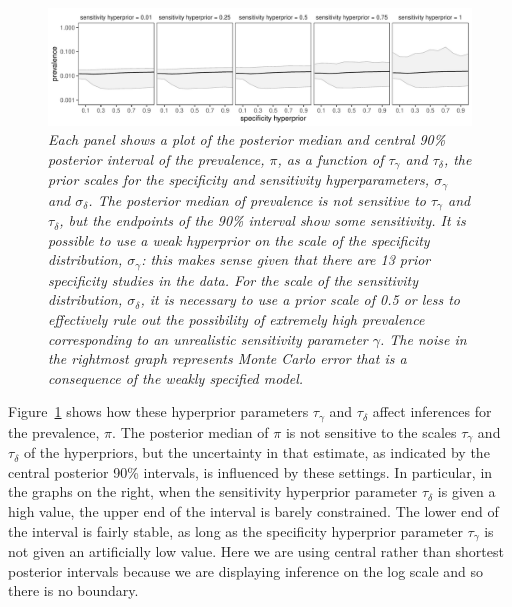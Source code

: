 \documentclass[11pt]{article}
\begin{document}
\begin{figure}
  \centerline{\includegraphics[width=\textwidth]{img/prior-sensitivity-2.pdf}}
  \vspace{-.15in}
\caption{\em Each panel shows a plot of the posterior median and central 90\%
  posterior interval of the prevalence, $\pi$, as a function of $\tau_{\gamma}$ and $\tau_{\delta}$, the prior scales for the specificity  and sensitivity
  hyperparameters, $\sigma_{\gamma}$ and $\sigma_{\delta}$.
  The posterior median of prevalence is not sensitive to $\tau_{\gamma}$ and $\tau_{\delta}$, but the endpoints of the 90\% interval show some sensitivity.  It is possible to use a weak hyperprior on the scale of the specificity distribution,  $\sigma_{\gamma}$:  this makes sense given that there are 13 prior specificity studies in the data.  For the scale of the sensitivity distribution,  $\sigma_{\delta}$, it is necessary to use a prior scale of 0.5 or less to effectively rule out the possibility of extremely high prevalence  corresponding to an unrealistic sensitivity parameter $\gamma$.  The noise in the rightmost graph represents Monte Carlo error that is a consequence of the weakly specified model.}\label{prior-sensitivity.fig}
\end{figure}
%
Figure~\ref{prior-sensitivity.fig} shows how these hyperprior
parameters $\tau_{\gamma}$ and $\tau_{\delta}$ affect inferences for
the prevalence, $\pi$.  The posterior median of $\pi$ is not sensitive
to the scales $\tau_{\gamma}$ and $\tau_{\delta}$ of the hyperpriors,
but the uncertainty in that estimate, as indicated by the central
posterior 90\% intervals, is influenced by these settings.  In
particular, in the graphs on the right, when the sensitivity
hyperprior parameter $\tau_{\delta}$ is given a high value, the upper
end of the interval is barely constrained.  The lower end of the
interval is fairly stable, as long as the specificity hyperprior
parameter $\tau_{\gamma}$ is not given an artificially low value. Here
we are using central rather than shortest posterior intervals because
we are displaying inference on the log scale and so there is no
boundary.
\end{document}
